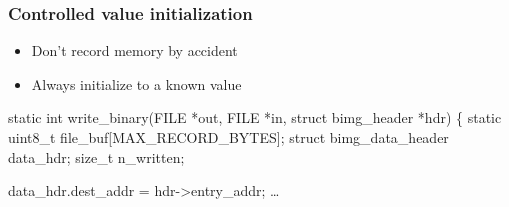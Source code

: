 \documentclass[14pt,aspectratio=169]{beamer}
\begin{document}
\begin{frame}[fragile]
 \frametitle{Controlled value initialization}

 \begin{itemize}
  \item Don't record memory by accident
  \item<2>Always initialize to a known value
 \end{itemize}

 \begin{example}
\begin{semiverbatim}\small
static int write_binary(FILE *out, FILE *in, struct bimg_header *hdr)
\{
       static uint8_t file_buf[MAX_RECORD_BYTES];
       struct bimg_data_header data_hdr;
       size_t n_written;

       data_hdr.dest_addr = hdr->entry_addr;
       …
\end{semiverbatim}
 \end{example}
\end{frame}

\begin{frame}[plain]
\end{frame}
\end{document}
